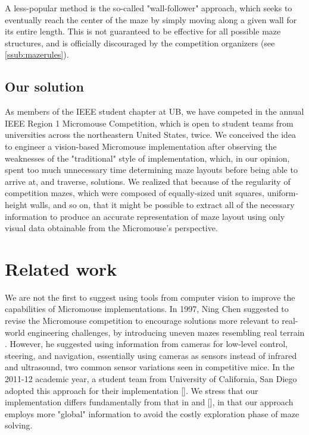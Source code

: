 \documentclass[10pt,twocolumn,letterpaper]{article}
\begin{document}
A less-popular method is the so-called "wall-follower" approach, which seeks to eventually reach the center of the maze
by simply moving along a given wall for its entire length.  This is not guaranteed to be effective for all possible maze
structures, and is officially discouraged by the competition organizers (see \textsection\ref{ssub:mazerules}).

\subsection{Our solution}
\label{sub:oursolution}

As members of the IEEE student chapter at UB, we have competed in the annual IEEE Region 1 Micromouse Competition, which
is open to student teams from universities across the northeastern United States, twice.  We conceived the idea to
engineer a vision-based Micromouse implementation after observing the weaknesses of the "traditional" style of
implementation, which, in our opinion, spent too much unnecessary time determining maze layouts before being able to
arrive at, and traverse, solutions.  We realized that because of the regularity of competition mazes, which were
composed of equally-sized unit squares, uniform-height walls, and so on, that it might be possible to extract all of the
necessary information to produce an accurate representation of maze layout using only visual data obtainable from the
Micromouse's perspective.

\section{Related work}
\label{sec:relatedwork}

We are not the first to suggest using tools from computer vision to improve the capabilities of Micromouse
implementations.  In 1997, Ning Chen suggested to revise the Micromouse competition to encourage solutions more relevant
to real-world engineering challenges, by introducing uneven mazes resembling real terrain \cite{Chen1997}.  However, he
suggested using information from cameras for low-level control, steering, and navigation, essentially using cameras as
sensors instead of infrared and ultrasound, two common sensor variations seen in competitive mice.  In the 2011-12
academic year, a student team from University of California, San Diego adopted this approach for their implementation
[].  We stress that our implementation differs fundamentally from that in \cite{Chen1997} and [], in that our approach
employs more "global" information to avoid the costly exploration phase of maze solving.
\end{document}
